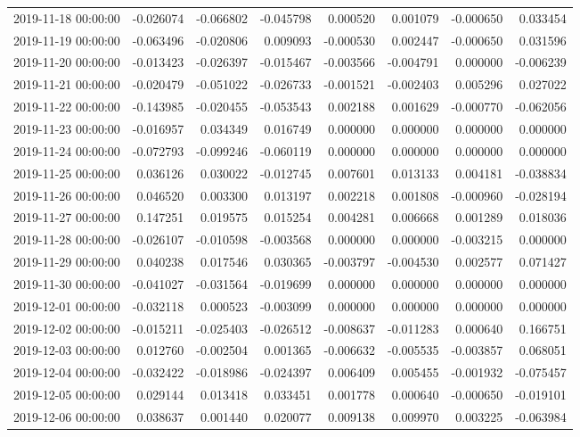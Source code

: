 \begin{tabular}{lrrrrrrr}
2019-11-18 00:00:00 & -0.026074 & -0.066802 & -0.045798 & 0.000520 & 0.001079 & -0.000650 & 0.033454 \\
2019-11-19 00:00:00 & -0.063496 & -0.020806 & 0.009093 & -0.000530 & 0.002447 & -0.000650 & 0.031596 \\
2019-11-20 00:00:00 & -0.013423 & -0.026397 & -0.015467 & -0.003566 & -0.004791 & 0.000000 & -0.006239 \\
2019-11-21 00:00:00 & -0.020479 & -0.051022 & -0.026733 & -0.001521 & -0.002403 & 0.005296 & 0.027022 \\
2019-11-22 00:00:00 & -0.143985 & -0.020455 & -0.053543 & 0.002188 & 0.001629 & -0.000770 & -0.062056 \\
2019-11-23 00:00:00 & -0.016957 & 0.034349 & 0.016749 & 0.000000 & 0.000000 & 0.000000 & 0.000000 \\
2019-11-24 00:00:00 & -0.072793 & -0.099246 & -0.060119 & 0.000000 & 0.000000 & 0.000000 & 0.000000 \\
2019-11-25 00:00:00 & 0.036126 & 0.030022 & -0.012745 & 0.007601 & 0.013133 & 0.004181 & -0.038834 \\
2019-11-26 00:00:00 & 0.046520 & 0.003300 & 0.013197 & 0.002218 & 0.001808 & -0.000960 & -0.028194 \\
2019-11-27 00:00:00 & 0.147251 & 0.019575 & 0.015254 & 0.004281 & 0.006668 & 0.001289 & 0.018036 \\
2019-11-28 00:00:00 & -0.026107 & -0.010598 & -0.003568 & 0.000000 & 0.000000 & -0.003215 & 0.000000 \\
2019-11-29 00:00:00 & 0.040238 & 0.017546 & 0.030365 & -0.003797 & -0.004530 & 0.002577 & 0.071427 \\
2019-11-30 00:00:00 & -0.041027 & -0.031564 & -0.019699 & 0.000000 & 0.000000 & 0.000000 & 0.000000 \\
2019-12-01 00:00:00 & -0.032118 & 0.000523 & -0.003099 & 0.000000 & 0.000000 & 0.000000 & 0.000000 \\
2019-12-02 00:00:00 & -0.015211 & -0.025403 & -0.026512 & -0.008637 & -0.011283 & 0.000640 & 0.166751 \\
2019-12-03 00:00:00 & 0.012760 & -0.002504 & 0.001365 & -0.006632 & -0.005535 & -0.003857 & 0.068051 \\
2019-12-04 00:00:00 & -0.032422 & -0.018986 & -0.024397 & 0.006409 & 0.005455 & -0.001932 & -0.075457 \\
2019-12-05 00:00:00 & 0.029144 & 0.013418 & 0.033451 & 0.001778 & 0.000640 & -0.000650 & -0.019101 \\
2019-12-06 00:00:00 & 0.038637 & 0.001440 & 0.020077 & 0.009138 & 0.009970 & 0.003225 & -0.063984 \\

\end{tabular}
